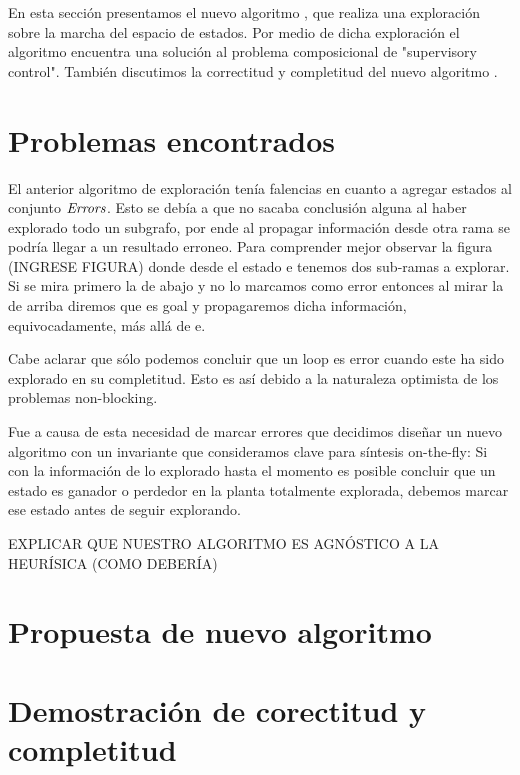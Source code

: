 En esta sección presentamos el nuevo algoritmo \DCS, que realiza una exploración sobre la marcha del espacio de estados. Por medio de dicha exploración el algoritmo encuentra una solución al problema composicional de "supervisory control". También discutimos la correctitud y completitud del nuevo algoritmo \DCS. \\

\section{Problemas encontrados}
El anterior algoritmo de exploración tenía falencias en cuanto a agregar estados al conjunto $\mathit{Errors}$. Esto se debía a que no sacaba conclusión alguna al haber explorado todo un subgrafo, por ende al propagar información desde otra rama se podría llegar a un resultado erroneo. Para comprender mejor observar la figura (INGRESE FIGURA) donde desde el estado e tenemos dos sub-ramas a explorar. Si se mira primero la de abajo y no lo marcamos como error entonces al mirar la de arriba diremos que es goal y propagaremos dicha información, equivocadamente, más allá de e.

Cabe aclarar que sólo podemos concluir que un loop es error cuando este ha sido explorado en su completitud. Esto es así debido a la naturaleza optimista de los problemas non-blocking.

Fue a causa de esta necesidad de marcar errores que decidimos diseñar un nuevo algoritmo con un invariante que consideramos clave para síntesis on-the-fly: Si con la información de lo explorado hasta el momento es posible concluir que un estado es ganador o perdedor en la planta totalmente explorada, debemos marcar ese estado antes de seguir explorando.

EXPLICAR QUE NUESTRO ALGORITMO ES AGNÓSTICO A LA HEURÍSICA (COMO DEBERÍA)

\section{Propuesta de nuevo algoritmo}



\section{Demostración de corectitud y completitud}

